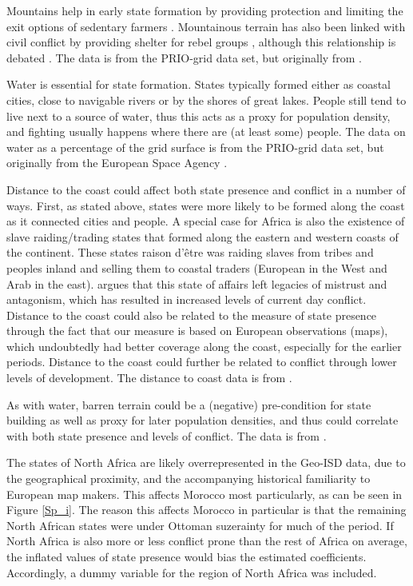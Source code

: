 \documentclass[12pt]{article}
\begin{document}
Mountains help in early state formation by providing protection and limiting the
exit options of sedentary farmers \citep{Carneiro1988}. Mountainous terrain has
also been linked with civil conflict by providing shelter for rebel groups
\citep{Hegre2006}, although this relationship is debated 
\citep{Buhaug2002}. The data is from the PRIO-grid data set, but originally 
from \citet{Blyth2002}. 

Water is essential for state formation. States typically formed either as
coastal cities, close to navigable rivers or by the shores of great lakes.
People still tend to live next to a source of water, thus this acts as a proxy
for population density, and fighting usually happens where there are (at least
some) people. The data on water as a percentage of the grid surface is from the
PRIO-grid data set, but originally from the European Space Agency
\citep{Bontemps2009}.

Distance to the coast could affect both state presence and conflict in a number
of ways. First, as stated above, states were more likely to be formed along the
coast as it connected cities and people. A special case for Africa is also the
existence of slave raiding/trading states that formed along the eastern and
western coasts of the continent. These states raison d'être was raiding slaves
from tribes and peoples inland and selling them to coastal traders (European in
the West and Arab in the east). \citet{Nunn2008} argues that this state of
affairs left legacies of mistrust and antagonism, which has resulted in
increased levels of current day conflict. Distance to the coast could also be
related to the measure of state presence through the fact that our measure is
based on European observations (maps), which undoubtedly had better coverage
along the coast, especially for the earlier periods. Distance to the coast could
further be related to conflict through lower levels of development. The distance
to coast data is from \citet{Wessel1996}.

As with water, barren terrain could be a (negative) pre-condition for state
building as well as proxy for later population densities, and thus could
correlate with both state presence and levels of conflict. The data is from
\citet{Bontemps2009}.

The states of North Africa are likely overrepresented in the Geo-ISD data, due
to the geographical proximity, and the accompanying historical familiarity to
European map makers. This affects Morocco most particularly, as can be 
seen in Figure \ref{Sp_i}. The reason this affects Morocco in particular is that
the remaining North African states were under Ottoman suzerainty for much of the
period. If North Africa is also more or less conflict prone than the rest of
Africa on average, the inflated values of state presence would bias the estimated
coefficients. Accordingly, a dummy variable for the region of North Africa was
included.
\end{document}
